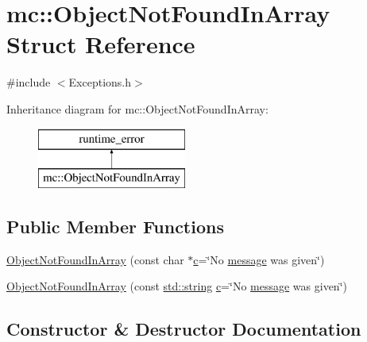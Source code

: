 \hypertarget{structmc_1_1_object_not_found_in_array}{}\section{mc\+:\+:Object\+Not\+Found\+In\+Array Struct Reference}
\label{structmc_1_1_object_not_found_in_array}


{\ttfamily \#include $<$Exceptions.\+h$>$}

Inheritance diagram for mc\+:\+:Object\+Not\+Found\+In\+Array\+:\begin{figure}[H]
\begin{center}
\leavevmode
\includegraphics[height=2.000000cm]{structmc_1_1_object_not_found_in_array}
\end{center}
\end{figure}
\subsection*{Public Member Functions}
\begin{DoxyCompactItemize}
\item 
\hyperlink{structmc_1_1_object_not_found_in_array_accc8985a7187fbcf5fc78527bb17ac67}{Object\+Not\+Found\+In\+Array} (const char $\ast$\hyperlink{_s_d_l__opengl__glext_8h_a1f2d7f8147412c43ba2303a56f97ee73}{c}=\char`\"{}No \hyperlink{_s_d_l__opengl__glext_8h_a7b6161cffb9b8aee272b3b916183d28c}{message} was given\char`\"{})
\item 
\hyperlink{structmc_1_1_object_not_found_in_array_a3c5cd8e08030600a0c2bde64fada71cc}{Object\+Not\+Found\+In\+Array} (const \hyperlink{_s_d_l__opengl__glext_8h_ae84541b4f3d8e1ea24ec0f466a8c568b}{std\+::string} \hyperlink{_s_d_l__opengl__glext_8h_a1f2d7f8147412c43ba2303a56f97ee73}{c}=\char`\"{}No \hyperlink{_s_d_l__opengl__glext_8h_a7b6161cffb9b8aee272b3b916183d28c}{message} was given\char`\"{})
\end{DoxyCompactItemize}


\subsection{Constructor \& Destructor Documentation}
